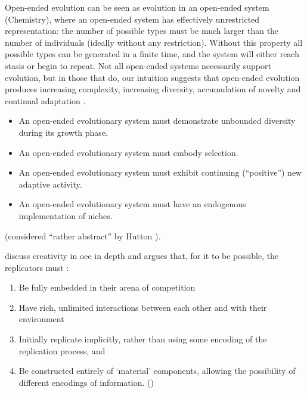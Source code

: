 Open-ended evolution can be seen as evolution in an open-ended system (\eg Chemistry), where an open-ended system has effectively unrestricted representation: the number of possible types must be much larger than the number of individuals (ideally without any restriction). Without this property all possible types can be generated in a finite time, and the system will either reach stasis or begin to repeat. Not all open-ended systems necessarily support evolution, but in those that do, our intuition suggests that open-ended evolution produces increasing complexity, increasing diversity, accumulation of novelty and continual adaptation \cite{Lehman2012}.


\begin{itemize}
	\item An open-ended evolutionary system must demonstrate unbounded diversity during its growth phase.
	\item An open-ended evolutionary system must embody selection.
	\item An open-ended evolutionary system must exhibit continuing (``positive'') new adaptive activity.
	\item An open-ended evolutionary system must have an endogenous implementation of niches.
\end{itemize} \cite{Maley1999} (considered ``rather abstract'' by Hutton \parencite[p.341]{Hutton2002}).

\Textcite{Taylor2001,Taylor:1999sc} discuss creativity in \gls{oee} in depth and argues that, for it to be possible, the replicators must \parencite{Hutton2004}:

\begin{enumerate}[label=\roman*] 
	\item Be fully embedded in their arena of competition 
	\item Have rich, unlimited interactions between each other and with their environment 
	\item Initially replicate implicitly, rather than using some encoding of the replication process, and 
	\item Be constructed entirely of `material' components, allowing the possibility of different encodings of information. ()
\end{enumerate}


